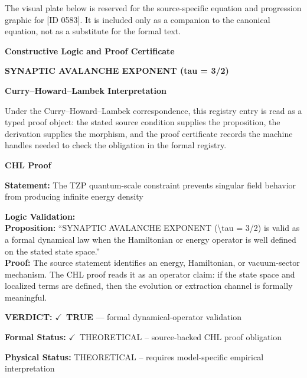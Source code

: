 \begingroup\footnotesize\sloppy
The visual plate below is reserved for the source-specific equation and progression graphic for [ID 0583]. It is included only as a companion to the canonical equation, not as a substitute for the formal text.
\par\endgroup
\ifTZPDarkEdition
{}
\fi

\clearpage
\begingroup\tzpsupportsetup
\noindent\textbf{\fontsize{10.8pt}{12.8pt}\selectfont [ID 0583] Constructive Logic and Proof Certificate}\par
\noindent\textbf{\fontsize{10pt}{12pt}\selectfont SYNAPTIC AVALANCHE EXPONENT (tau = 3/2)}\par
\vspace{0.45em}
\begingroup
\footnotesize
\setlength{\parskip}{0.22em}
\setlength{\parindent}{0pt}
\noindent\textbf{Curry--Howard--Lambek Interpretation}\par
Under the Curry--Howard--Lambek correspondence, this registry entry is read as a typed proof
object: the stated source condition supplies the proposition, the derivation supplies the
morphism, and the proof certificate records the machine handles needed to check the obligation
in the formal registry.

\vspace{0.45em}
\noindent\textbf{CHL Proof}\par
\textbf{Statement:} The TZP quantum-scale constraint prevents singular field behavior from producing
infinite energy density

\textbf{Logic Validation:}\\
\textbf{Proposition:} ``SYNAPTIC AVALANCHE EXPONENT (\textbackslash{}tau = 3/2) is valid as a formal dynamical law when the
Hamiltonian or energy operator is well defined on the stated state space.''\\
\textbf{Proof:} The source statement identifies an energy, Hamiltonian, or vacuum-sector mechanism. The
CHL proof reads it as an operator claim: if the state space and localized terms are
defined, then the evolution or extraction channel is formally meaningful.

\textbf{VERDICT:} \ensuremath{\checkmark}\ \textbf{TRUE} --- formal dynamical-operator validation

\textbf{Formal Status:} \ensuremath{\checkmark}\ THEORETICAL -- source-backed CHL proof obligation

\textbf{Physical Status:} THEORETICAL -- requires model-specific empirical interpretation
\par\vspace{0.45em}
\par
\ifTZPDarkEdition
{}
\fi
\endgroup
\endgroup
